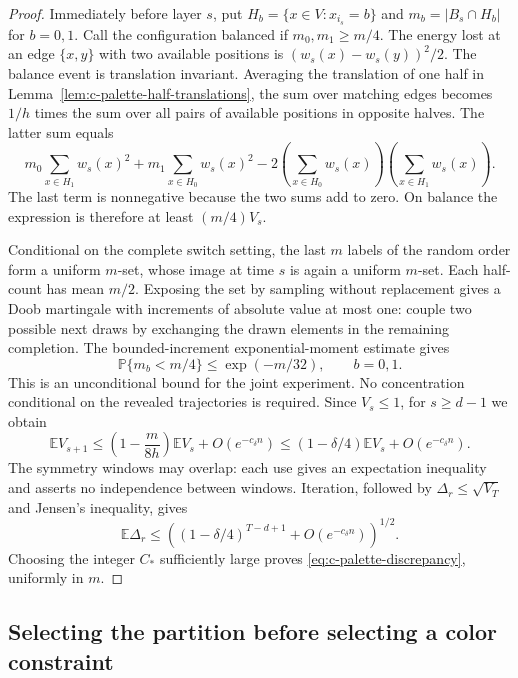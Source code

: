 \begin{proof}
Immediately before layer $s$, put $H_b=\{x\in V:x_{i_s}=b\}$ and
$m_b=|B_s\cap H_b|$ for $b=0,1$. Call the configuration balanced if
$m_0,m_1\ge m/4$.  The energy lost at an edge $\{x,y\}$ with two
available positions is $(w_s(x)-w_s(y))^2/2$.  The balance event is translation invariant.
Averaging the translation of one half in
Lemma~\ref{lem:c-palette-half-translations}, the sum over matching edges
becomes $1/h$ times the sum over all pairs of available positions in
opposite halves.  The latter sum equals
\[
 m_0\sum_{x\in H_1}w_s(x)^2+
 m_1\sum_{x\in H_0}w_s(x)^2
 -2\left(\sum_{x\in H_0}w_s(x)\right)
    \left(\sum_{x\in H_1}w_s(x)\right).
\]
The last term is nonnegative because the two sums add to zero.  On
balance the expression is therefore at least $(m/4)V_s$.

Conditional on the complete switch setting, the last $m$ labels of the
random order form a uniform $m$-set, whose image at time $s$ is again a
uniform $m$-set.  Each half-count has mean $m/2$.  Exposing the set by
sampling without replacement gives a Doob martingale with increments
of absolute value at most one: couple two possible next draws by
exchanging the drawn elements in the remaining completion.  The
bounded-increment exponential-moment estimate gives
\[
 \mathbb P\{m_b<m/4\}\le \exp(-m/32),\qquad b=0,1.
\]
This is an unconditional bound for the joint experiment.  No
concentration conditional on the revealed trajectories is required.
Since $V_s\le1$, for $s\ge d-1$ we obtain
\[
 \mathbb EV_{s+1}
 \le\left(1-\frac{m}{8h}\right)\mathbb EV_s
       +O(e^{-c_\delta n})
 \le(1-\delta/4)\mathbb EV_s+O(e^{-c_\delta n}).
\]
The symmetry windows may overlap: each use gives an expectation
inequality and asserts no independence between windows.  Iteration,
followed by $\Delta_r\le\sqrt{V_T}$ and Jensen's inequality, gives
\[
 \mathbb E\Delta_r
 \le\left((1-\delta/4)^{T-d+1}
                  +O(e^{-c_\delta n})\right)^{1/2}.
\]
Choosing the integer $C_*$ sufficiently large proves
\eqref{eq:c-palette-discrepancy}, uniformly in $m$.
\end{proof}

\subsection{Selecting the partition before selecting a color constraint}

